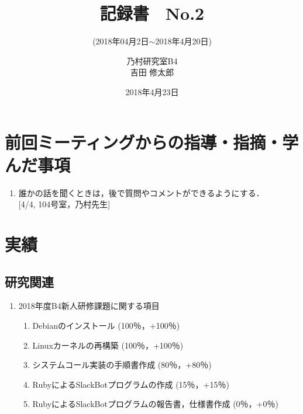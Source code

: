 \documentclass[fleqn, 14pt]{extarticle}
\subtitle{(2018年04月2日$\sim$2018年4月20日)}
\author{乃村研究室B4\\吉田 修太郎}
\date{2018年4月23日}
\title{記録書　No.2}
\begin{document}
\maketitle
\section{前回ミーティングからの指導・指摘・学んだ事項}
\label{sec1}
\begin{enumerate}
\item 誰かの話を聞くときは，後で質問やコメントができるようにする．\\
  \hfill[4/4, 104号室，乃村先生]
\end{enumerate}

\section{実績}
\label{sec2}
\subsection{研究関連}
\label{sec2-1}
\begin{enumerate}
\item 2018年度B4新人研修課題に関する項目
  \hfill
  \label{sec2-1-1}
  \begin{enumerate}
  \item Debianのインストール
    \hfill
    \label{sec2-1-1-enum1}
    (100％，+100％)
  \item Linuxカーネルの再構築
    \hfill
    \label{sec2-1-1-enum2}
    (100％，+100％)
  \item システムコール実装の手順書作成
    \hfill
    \label{sec2-1-1-enum3}
    (80％，+80％)
  \item RubyによるSlackBotプログラムの作成
    \hfill
    \label{sec2-1-1-enum4}
    (15％，+15％)
  \item RubyによるSlackBotプログラムの報告書，仕様書作成
    \hfill
    \label{sec2-1-1-enum5}
    (0％，+0％)
  \end{enumerate}
\end{enumerate}
\end{document}
